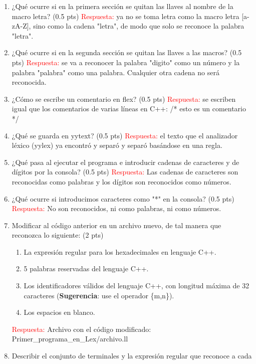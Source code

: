 \documentclass[11pt]{report}
\begin{document}
\begin{enumerate}
  \item ¿Qué ocurre si en la primera sección se quitan las llaves al nombre de la macro
    letra? (0.5 pts)
    \textcolor{red}{Respuesta:} ya no se toma letra como la macro letra [a-zA-Z], sino
    como la cadena "letra", de modo que solo se reconoce la palabra "letra".
  \item ¿Qué ocurre si en la segunda sección se quitan las llaves a las macros? (0.5 pts)
    \textcolor{red}{Respuesta:} se va a reconocer la palabra "digito" como un número y la
    palabra "palabra" como una palabra. Cualquier otra cadena no será reconocida.
  \item ¿Cómo se escribe un comentario en flex? (0.5 pts)
    \textcolor{red}{Respuesta:} se escriben igual que los comentarios de varias líneas en C++:
    /* esto es un comentario */
  \item ¿Qué se guarda en yytext? (0.5 pts)
    \textcolor{red}{Respuesta:} el texto que el analizador léxico (yylex) ya encontró y separó
    y separó basándose en una regla.
  \item ¿Qué pasa al ejecutar el programa e introducir cadenas de caracteres y de dígitos
    por la consola? (0.5 pts)
    \textcolor{red}{Respuesta:} Las cadenas de caracteres son reconocidas como palabras y
    los dígitos son reconocidos como números.
  \item ¿Qué ocurre si introducimos caracteres como "*" en la consola? (0.5 pts)
    \textcolor{red}{Respuesta:} No son reconocidos, ni como palabras, ni como números.
  \item Modificar al código anterior en un archivo nuevo, de tal manera que reconozca lo
    siguiente: (2 pts)
    \begin{enumerate}[label=\roman*.]
      \item La expresión regular para los hexadecimales en lenguaje C++.
      \item 5 palabras reservadas del lenguaje C++.
      \item Los identificadores válidos del lenguaje C++, con longitud máxima de 32
        caracteres (\textbf{Sugerencia}: use el operador \{m,n\}).
      \item Los espacios en blanco.
    \end{enumerate}
    \textcolor{red}{Respuesta:} Archivo con el código modificado: Primer\_programa\_en\_Lex/archivo.ll
  \item Describir el conjunto de terminales y la expresión regular que reconoce a cada

\end{enumerate}
\end{document}
